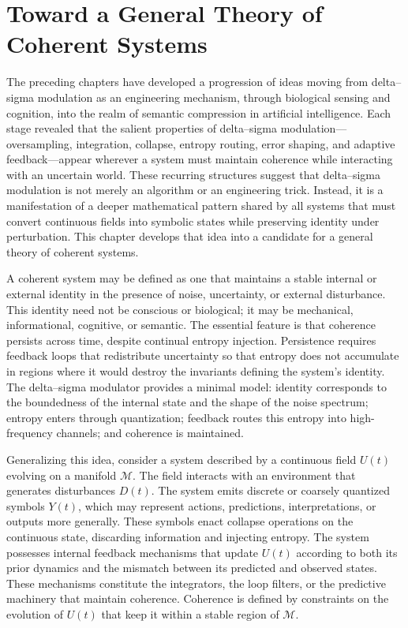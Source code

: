 
\chapter{Toward a General Theory of Coherent Systems}

The preceding chapters have developed a progression of ideas moving from delta–sigma modulation as an engineering mechanism, through biological sensing and cognition, into the realm of semantic compression in artificial intelligence. Each stage revealed that the salient properties of delta–sigma modulation—oversampling, integration, collapse, entropy routing, error shaping, and adaptive feedback—appear wherever a system must maintain coherence while interacting with an uncertain world. These recurring structures suggest that delta–sigma modulation is not merely an algorithm or an engineering trick. Instead, it is a manifestation of a deeper mathematical pattern shared by all systems that must convert continuous fields into symbolic states while preserving identity under perturbation. This chapter develops that idea into a candidate for a general theory of coherent systems.

A coherent system may be defined as one that maintains a stable internal or external identity in the presence of noise, uncertainty, or external disturbance. This identity need not be conscious or biological; it may be mechanical, informational, cognitive, or semantic. The essential feature is that coherence persists across time, despite continual entropy injection. Persistence requires feedback loops that redistribute uncertainty so that entropy does not accumulate in regions where it would destroy the invariants defining the system’s identity. The delta–sigma modulator provides a minimal model: identity corresponds to the boundedness of the internal state and the shape of the noise spectrum; entropy enters through quantization; feedback routes this entropy into high-frequency channels; and coherence is maintained.

Generalizing this idea, consider a system described by a continuous field \(U(t)\) evolving on a manifold \(\mathcal{M}\). The field interacts with an environment that generates disturbances \(D(t)\). The system emits discrete or coarsely quantized symbols \(Y(t)\), which may represent actions, predictions, interpretations, or outputs more generally. These symbols enact collapse operations on the continuous state, discarding information and injecting entropy. The system possesses internal feedback mechanisms that update \(U(t)\) according to both its prior dynamics and the mismatch between its predicted and observed states. These mechanisms constitute the integrators, the loop filters, or the predictive machinery that maintain coherence. Coherence is defined by constraints on the evolution of \(U(t)\) that keep it within a stable region of \(\mathcal{M}\).

